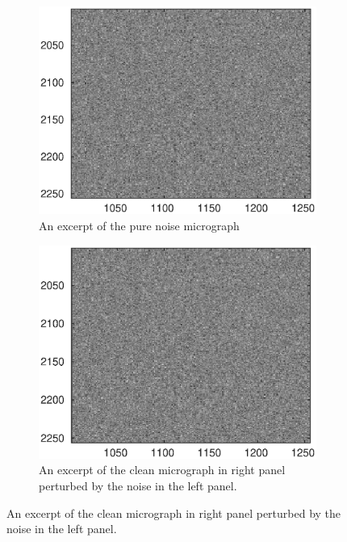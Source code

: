 \documentclass[9pt,twocolumn,twoside,lineno]{pnas-new}
\begin{document}
\begin{figure}[h]
	\centering
	\begin{subfigure}[h]{0.3\textwidth}
		\centering
		\includegraphics[scale=0.4]{pure_noise_micrograph_cutout.eps}
		\caption{An excerpt of the pure noise micrograph}
	\end{subfigure} \hspace{2pt}
	\begin{subfigure}[h]{0.3\textwidth}
		\centering
		\includegraphics[scale=0.4]{noisy_micrograph_cutout.eps}
		\caption{An excerpt of the clean micrograph in right panel perturbed by the noise in the left panel.}
	\end{subfigure} \hspace{2pt}

\end{figure}
\end{document}
